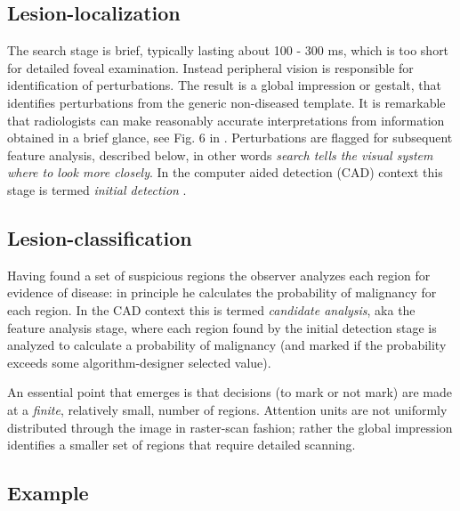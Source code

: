 \documentclass[
]{book}
\begin{document}
\hypertarget{visual-search-glancing-global-impression}{%
\subsection{Lesion-localization}\label{visual-search-glancing-global-impression}}

The search stage is brief, typically lasting about 100 - 300 ms, which is too short for detailed foveal examination. Instead peripheral vision is responsible for identification of perturbations. The result is a global impression or gestalt, that identifies perturbations from the generic non-diseased template. It is remarkable that radiologists can make reasonably accurate interpretations from information obtained in a brief glance, see Fig. 6 in \citep{nodine1987using}. Perturbations are flagged for subsequent feature analysis, described below, in other words \emph{search tells the visual system where to look more closely}. In the computer aided detection (CAD) context this stage is termed \emph{initial detection} \citep{edwards2002maximum}.

\hypertarget{visual-search-scanning-local-feature-analysis}{%
\subsection{Lesion-classification}\label{visual-search-scanning-local-feature-analysis}}

Having found a set of suspicious regions the observer analyzes each region for evidence of disease: in principle he calculates the probability of malignancy for each region. In the CAD context this is termed \emph{candidate analysis}, aka the feature analysis stage, where each region found by the initial detection stage is analyzed to calculate a probability of malignancy (and marked if the probability exceeds some algorithm-designer selected value).

An essential point that emerges is that decisions (to mark or not mark) are made at a \emph{finite}, relatively small, number of regions. Attention units are not uniformly distributed through the image in raster-scan fashion; rather the global impression identifies a smaller set of regions that require detailed scanning.

\hypertarget{visual-search-example}{%
\subsection{Example}\label{visual-search-example}}
\end{document}
